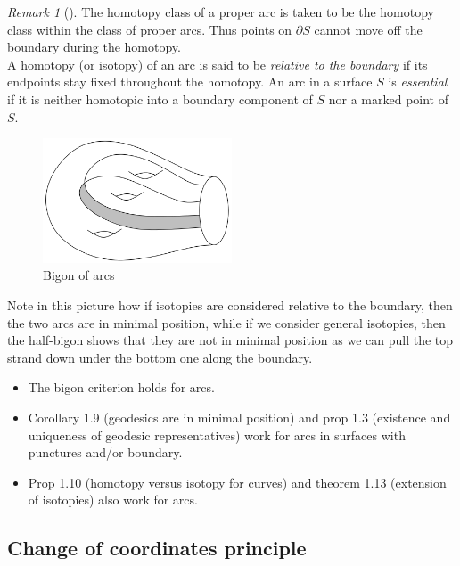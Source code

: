 \documentclass[reqno]{amsart}
\theoremstyle{definition}
\theoremstyle{remark}
\newtheorem*{remark}{Remark}
\begin{document}
\begin{remark}[]
    The homotopy class of a proper arc is taken to be
    the homotopy class within the class of proper arcs.
    Thus points on $\partial S$ cannot move off the boundary
    during the homotopy.\\
    A homotopy (or isotopy) of an arc is said to
    be \textit{relative to the boundary} if its endpoints
    stay fixed throughout the homotopy. 
    An arc in a surface $S$ is \textit{essential} if it
    is neither homotopic into a boundary component of $S$ nor a
    marked point of $S$.
\end{remark}

\begin{figure}[htpb]
    \centering
    \includegraphics[width=0.5\textwidth]{bigon-of-arcs.png}
    \caption{Bigon of arcs}
    \label{fig:bigon-of-arcs-png}
\end{figure}
Note in this picture how if isotopies are considered relative
to the boundary, then the two arcs are in minimal position, while
if we consider general isotopies, then the half-bigon shows that
they are not in minimal position as we can pull the top strand down
under the bottom one along the boundary.

\begin{itemize}
    \item The bigon criterion holds for arcs.
    \item Corollary 1.9 (geodesics are in minimal position)
        and prop 1.3 (existence and uniqueness of geodesic 
        representatives) work for arcs in surfaces with
        punctures and/or boundary.
        \todo{}
    \item Prop 1.10 (homotopy versus isotopy for curves) and
        theorem 1.13 (extension of isotopies) also
        work for arcs.
\end{itemize}

\subsection{Change of coordinates principle}
\end{document}
